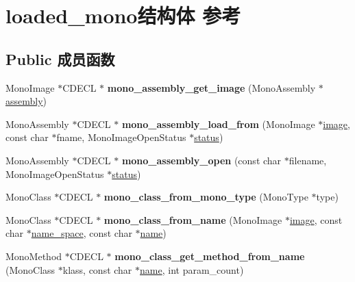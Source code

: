 \hypertarget{structloaded__mono}{}\section{loaded\+\_\+mono结构体 参考}
\label{structloaded__mono}
\subsection*{Public 成员函数}
\begin{DoxyCompactItemize}
\item 
\mbox{\label{structloaded__mono_a4fede5f6f3514702d4e027db8964b0ba}} 
Mono\+Image $\ast$C\+D\+E\+CL $\ast$ {\bfseries mono\+\_\+assembly\+\_\+get\+\_\+image} (Mono\+Assembly $\ast$\hyperlink{structassembly}{assembly})
\item 
\mbox{\label{structloaded__mono_aface4a420f97da5820836d7750af41d7}} 
Mono\+Assembly $\ast$C\+D\+E\+CL $\ast$ {\bfseries mono\+\_\+assembly\+\_\+load\+\_\+from} (Mono\+Image $\ast$\hyperlink{interfacevoid}{image}, const char $\ast$fname, Mono\+Image\+Open\+Status $\ast$\hyperlink{structstatus}{status})
\item 
\mbox{\label{structloaded__mono_a70a57128edd9b54807376069521443c7}} 
Mono\+Assembly $\ast$C\+D\+E\+CL $\ast$ {\bfseries mono\+\_\+assembly\+\_\+open} (const char $\ast$filename, Mono\+Image\+Open\+Status $\ast$\hyperlink{structstatus}{status})
\item 
\mbox{\label{structloaded__mono_a91cfc566bc830c88edb4f584e2527bc7}} 
Mono\+Class $\ast$C\+D\+E\+CL $\ast$ {\bfseries mono\+\_\+class\+\_\+from\+\_\+mono\+\_\+type} (Mono\+Type $\ast$type)
\item 
\mbox{\label{structloaded__mono_ac6d7a08767b237473033c1b3ef0a758c}} 
Mono\+Class $\ast$C\+D\+E\+CL $\ast$ {\bfseries mono\+\_\+class\+\_\+from\+\_\+name} (Mono\+Image $\ast$\hyperlink{interfacevoid}{image}, const char $\ast$\hyperlink{structname__space}{name\+\_\+space}, const char $\ast$\hyperlink{structname}{name})
\item 
\mbox{\label{structloaded__mono_a621f549c1fcaf35023b78ec86f79ce66}} 
Mono\+Method $\ast$C\+D\+E\+CL $\ast$ {\bfseries mono\+\_\+class\+\_\+get\+\_\+method\+\_\+from\+\_\+name} (Mono\+Class $\ast$klass, const char $\ast$\hyperlink{structname}{name}, int param\+\_\+count)

\end{DoxyCompactItemize}
